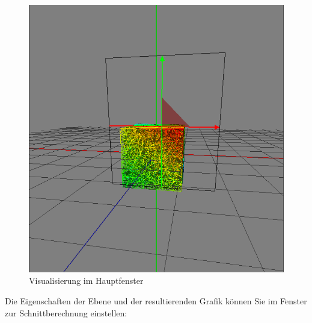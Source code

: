 \documentclass[10pt,a5paper,twoside,titlepage]{scrartcl}
\begin{document}
	\begin{figure}
	\centering
	\includegraphics[trim=0cm 0cm 0cm 0cm,clip=true,scale=.3
	]{render_cut_vis.png}
	\caption{Visualisierung im Hauptfenster}
	\label{fig:sa_vis_cut}
	\end{figure}	
	Die Eigenschaften der Ebene und der resultierenden Grafik können Sie im Fenster zur Schnittberechnung einstellen:
\end{document}
